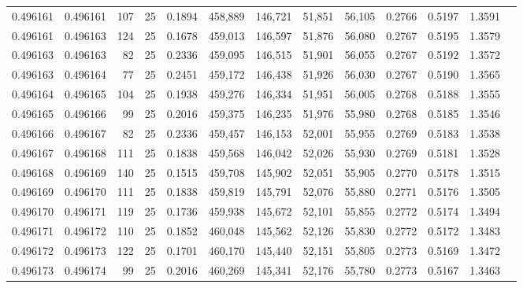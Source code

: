 \begin{tabular}{rrrrrrrrrrrrr}
0.496161 & 0.496161 &   107 &  25 &                                     0.1894 & 458,889 & 146,721 &  51,851 &  56,105 & 0.2766 & 0.5197 & 1.3591 \\
0.496161 & 0.496163 &   124 &  25 &                                     0.1678 & 459,013 & 146,597 &  51,876 &  56,080 & 0.2767 & 0.5195 & 1.3579 \\
0.496163 & 0.496163 &    82 &  25 &                                     0.2336 & 459,095 & 146,515 &  51,901 &  56,055 & 0.2767 & 0.5192 & 1.3572 \\
0.496163 & 0.496164 &    77 &  25 &                                     0.2451 & 459,172 & 146,438 &  51,926 &  56,030 & 0.2767 & 0.5190 & 1.3565 \\
0.496164 & 0.496165 &   104 &  25 &                                     0.1938 & 459,276 & 146,334 &  51,951 &  56,005 & 0.2768 & 0.5188 & 1.3555 \\
0.496165 & 0.496166 &    99 &  25 &                                     0.2016 & 459,375 & 146,235 &  51,976 &  55,980 & 0.2768 & 0.5185 & 1.3546 \\
0.496166 & 0.496167 &    82 &  25 &                                     0.2336 & 459,457 & 146,153 &  52,001 &  55,955 & 0.2769 & 0.5183 & 1.3538 \\
0.496167 & 0.496168 &   111 &  25 &                                     0.1838 & 459,568 & 146,042 &  52,026 &  55,930 & 0.2769 & 0.5181 & 1.3528 \\
0.496168 & 0.496169 &   140 &  25 &                                     0.1515 & 459,708 & 145,902 &  52,051 &  55,905 & 0.2770 & 0.5178 & 1.3515 \\
0.496169 & 0.496170 &   111 &  25 &                                     0.1838 & 459,819 & 145,791 &  52,076 &  55,880 & 0.2771 & 0.5176 & 1.3505 \\
0.496170 & 0.496171 &   119 &  25 &                                     0.1736 & 459,938 & 145,672 &  52,101 &  55,855 & 0.2772 & 0.5174 & 1.3494 \\
0.496171 & 0.496172 &   110 &  25 &                                     0.1852 & 460,048 & 145,562 &  52,126 &  55,830 & 0.2772 & 0.5172 & 1.3483 \\
0.496172 & 0.496173 &   122 &  25 &                                     0.1701 & 460,170 & 145,440 &  52,151 &  55,805 & 0.2773 & 0.5169 & 1.3472 \\
0.496173 & 0.496174 &    99 &  25 &                                     0.2016 & 460,269 & 145,341 &  52,176 &  55,780 & 0.2773 & 0.5167 & 1.3463 \\

\end{tabular}
